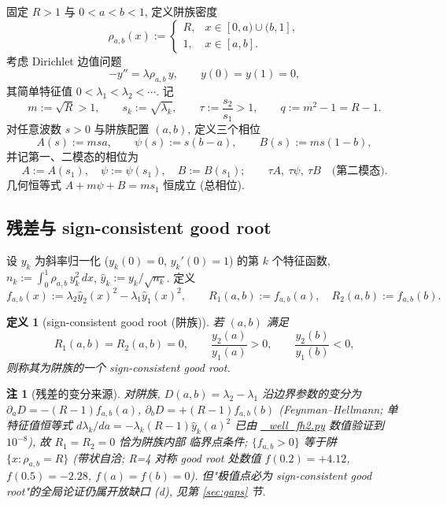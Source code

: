 \documentclass[UTF8]{ctexart}
\newtheorem{remark}[theorem]{注}
\newtheorem{definition}[theorem]{定义}
\begin{document}
固定 $R>1$ 与 $0<a<b<1$, 定义阱族密度
\begin{equation}
	\rho_{a,b}(x):=
	\begin{cases}
		R, & x\in[0,a)\cup(b,1],\\
		1, & x\in[a,b].
	\end{cases}
	\label{eq:well}
\end{equation}
考虑 Dirichlet 边值问题
\begin{equation}
	-y''=\lambda\rho_{a,b}\,y,\qquad y(0)=y(1)=0,
\end{equation}
其简单特征值 $0<\lambda_1<\lambda_2<\cdots$. 记
\begin{equation}
	m:=\sqrt R>1,\qquad s_k:=\sqrt{\lambda_k},\qquad
	\tau:=\frac{s_2}{s_1}>1,\qquad q:=m^2-1=R-1.
	\label{eq:params}
\end{equation}
对任意波数 $s>0$ 与阱族配置 $(a,b)$, 定义三个相位
\begin{equation}
	A(s):=msa,\qquad \psi(s):=s(b-a),\qquad B(s):=ms(1-b),
	\label{eq:phases}
\end{equation}
并记第一、二模态的相位为
\begin{equation}
	A:=A(s_1),\quad \psi:=\psi(s_1),\quad B:=B(s_1);
	\qquad \tau A,\ \tau\psi,\ \tau B \quad\text{(第二模态)}.
\end{equation}
几何恒等式 $A+m\psi+B=ms_1$ 恒成立 (总相位).

\subsection{残差与 sign-consistent good root}

设 $y_k$ 为斜率归一化 ($y_k(0)=0$, $y_k'(0)=1$) 的第 $k$ 个特征函数,
$n_k:=\int_0^1\rho_{a,b}\,y_k^2\,dx$, $\hat y_k:=y_k/\sqrt{n_k}$. 定义
\begin{equation}
	f_{a,b}(x):=\lambda_2\hat y_2(x)^2-\lambda_1\hat y_1(x)^2,
	\qquad R_1(a,b):=f_{a,b}(a),\quad R_2(a,b):=f_{a,b}(b).
	\label{eq:resid}
\end{equation}
\begin{definition}[sign-consistent good root (阱族)]
	若 $(a,b)$ 满足
	\begin{equation}
		R_1(a,b)=R_2(a,b)=0,\qquad
		\frac{y_2(a)}{y_1(a)}>0,\qquad \frac{y_2(b)}{y_1(b)}<0,
		\label{eq:goodroot}
	\end{equation}
	则称其为阱族的一个 sign-consistent good root.
\end{definition}

\begin{remark}[残差的变分来源] \label{rem:fh}
	对阱族, $D(a,b)=\lambda_2-\lambda_1$ 沿边界参数的变分为
	$\partial_a D=-(R-1)f_{a,b}(a)$, $\partial_b D=+(R-1)f_{a,b}(b)$
	(Feynman--Hellmann; 单特征值恒等式 $d\lambda_k/da=-\lambda_k(R-1)\hat y_k(a)^2$
	已由 \url{_well_fh2.py} 数值验证到 $10^{-8}$), 故 $R_1=R_2=0$ 恰为阱族内部
	临界点条件; $\{f_{a,b}>0\}$ 等于阱 $\{x:\rho_{a,b}=R\}$ (带状自洽;
	R=4 对称 good root 处数值 $f(0.2)=+4.12$, $f(0.5)=-2.28$, $f(a)=f(b)=0$).
	但"极值点必为 sign-consistent good root"的全局论证仍属开放缺口 (d),
	见第 \ref{sec:gaps} 节.
\end{remark}
\end{document}
